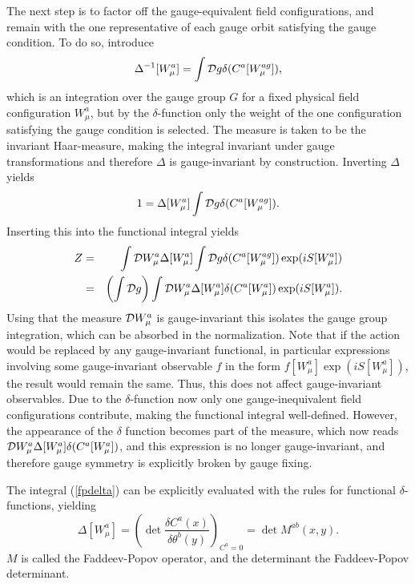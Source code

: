 \documentclass[final,12pt]{article}
\newcommand*{\no}{\noindent}
\newcommand*{\bea}{\begin{eqnarray}}
\newcommand*{\eea}{\end{eqnarray}}
\newcommand*{\be}{\begin{equation}}
\newcommand*{\ee}{\end{equation}}
\newcommand*{\pref}[1]{(\ref{#1})}
\newcommand*{\nn}{\nonumber}
\newcommand*{\1}{1\!\!\!\bot}
\begin{document}
The next step is to factor off the gauge-equivalent field configurations, and remain with the one representative of each gauge orbit satisfying the gauge condition. To do so, introduce
\be
\Delta^{-1}[W_\mu^a]=\int {\cal D}g \delta(C^a[W_\mu^{ag}])\label{fpdelta},
\ee
\no which is an integration over the gauge group $G$ for a fixed physical field configuration $W_\mu^a$, but by the $\delta$-function only the weight of the one configuration satisfying the gauge condition is selected. The measure is taken to be the invariant Haar-measure, making the integral invariant under gauge transformations and therefore $\Delta$ is gauge-invariant by construction. Inverting $\Delta$ yields
\be
1=\Delta[W_\mu^a]\int{\cal D}g\delta(C^a[W_\mu^{ag}])\label{invertdelta}.
\ee
\no Inserting this into the functional integral yields
\bea
Z&=&\int{\cal D}W_\mu^a \Delta[W_\mu^a]\int{\cal D}g\delta(C^a[W_\mu^{ag}])\exp(iS[W_\mu^a])\nn\\
&=&\left(\int{\cal D}g\right)\int{\cal D}W_\mu^{a}\Delta[W_\mu^{a}]\delta(C^a[W_\mu^{a}])\exp(iS[W_\mu^{a}])\label{gffpexp}.
\eea
\no Using that the measure ${\cal D}W_\mu^a$ is gauge-invariant this isolates the gauge group integration, which can be absorbed in the normalization. Note that if the action would be replaced by any gauge-invariant functional, in particular expressions involving some gauge-invariant observable $f$ in the form $f[W_\mu^a]\exp(iS[W_\mu^a])$, the result would remain the same. Thus, this does not affect gauge-invariant observables. Due to the $\delta$-function now only one gauge-inequivalent field configurations contribute, making the functional integral well-defined. However, the appearance of the $\delta$ function becomes part of the measure, which now reads ${\cal D}W_\mu^a\Delta[W_\mu^{a}]\delta(C^a[W_\mu^{a}])$, and this expression is no longer gauge-invariant, and therefore gauge symmetry is explicitly broken by gauge fixing.

The integral \pref{fpdelta} can be explicitly evaluated with the rules for functional $\delta$-functions, yielding
\be
\Delta[W_\mu^a]=\left(\det\frac{\delta C^a(x)}{\delta\theta^b(y)}\right)_{C^a=0}=\det M^{ab}(x,y)\label{fpdet}.
\ee
\no $M$ is called the Faddeev-Popov operator, and the determinant the Faddeev-Popov determinant.
\end{document}

